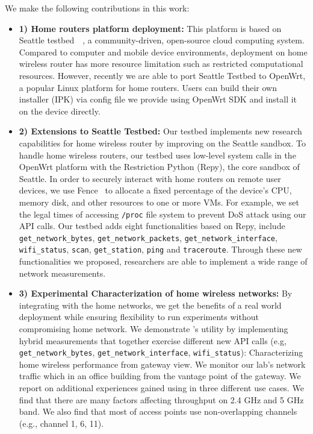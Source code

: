 We make the following contributions in this work:
{\raggedright
\begin{itemize}
\item\textbf{1) Home routers platform deployment:} This platform is based on Seattle testbed~\cite{zhuang2013experience}~\cite{cappos2009seattle}, a community-driven, open-source cloud computing system. Compared to computer and mobile device environments, deployment on home wireless router has more resource limitation such as restricted computational resources. However, recently we are able to port Seattle Testbed to OpenWrt, a popular Linux platform for home routers\cite{openwrt}. Users can build their own \sysname installer (IPK) via config file we provide using OpenWrt SDK and install it on the device directly. 
\item\textbf{2) Extensions to Seattle Testbed:}  Our testbed implements new research capabilities for home wireless router by improving on the Seattle sandbox. To handle home wireless routers, our testbed uses low-level system calls in the OpenWrt platform with the Restriction Python (Repy)\cite{cappos2010retaining}, the core sandbox of Seattle. In order to securely interact with home routers on remote user devices, we use Fence~\cite{li2015fence} to allocate a fixed percentage of the device's CPU, memory disk, and other resources to one or more VMs. For example, we set the legal times of accessing \texttt{/proc} file system to prevent DoS attack using our API calls. Our testbed adds eight functionalities based on Repy, include \texttt{get\_network\_bytes}, \texttt{get\_network\_packets}, \texttt{get\_network\_interface}, \texttt{wifi\_status}, \texttt{scan}, \texttt{get\_station}, \texttt{ping} and \texttt{traceroute}. Through these new functionalities we proposed, researchers are able to implement a wide range of network measurements.
\item\textbf{3) Experimental Characterization of home wireless networks:} By integrating \sysname with the home networks, we get the benefits of a real world deployment while ensuring flexibility to run experiments without compromising home network. We demonstrate \sysname's utility by implementing hybrid measurements that together exercise different new API calls (e.g, \texttt{get\_network\_bytes}, \texttt{get\_network\_interface}, \texttt{wifi\_status}): Characterizing home wireless performance from gateway view. We monitor our lab's network traffic which in an office building from the vantage point of the gateway. We report on additional experiences gained using \sysname in three different use cases. We find that there are many factors affecting throughput on 2.4 GHz and 5 GHz band. We also find that most of access points use non-overlapping channels (e.g., channel 1, 6, 11). 
\end{itemize}
\par}
